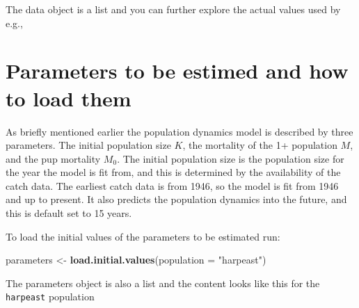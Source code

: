 \documentclass[
]{article}
\newenvironment{Shaded}{\begin{snugshade}}{\end{snugshade}}
\newcommand{\CommentTok}[1]{\textcolor[rgb]{0.56,0.35,0.01}{\textit{#1}}}
\newcommand{\DataTypeTok}[1]{\textcolor[rgb]{0.13,0.29,0.53}{#1}}
\newcommand{\KeywordTok}[1]{\textcolor[rgb]{0.13,0.29,0.53}{\textbf{#1}}}
\newcommand{\NormalTok}[1]{#1}
\newcommand{\OperatorTok}[1]{\textcolor[rgb]{0.81,0.36,0.00}{\textbf{#1}}}
\newcommand{\StringTok}[1]{\textcolor[rgb]{0.31,0.60,0.02}{#1}}
\begin{document}
The data object is a list and you can further explore the actual values
used by e.g.,

\begin{Shaded}
\end{Shaded}

\hypertarget{parameters-to-be-estimed-and-how-to-load-them}{%
\section{Parameters to be estimed and how to load
them}\label{parameters-to-be-estimed-and-how-to-load-them}}

As briefly mentioned earlier the population dynamics model is described
by three parameters. The initial population size \(K\), the mortality of
the 1+ population \(M\), and the pup mortality \(M_0\). The initial
population size is the population size for the year the model is fit
from, and this is determined by the availability of the catch data. The
earliest catch data is from 1946, so the model is fit from 1946 and up
to present. It also predicts the population dynamics into the future,
and this is default set to 15 years.

To load the initial values of the parameters to be estimated run:

\begin{Shaded}
\begin{Highlighting}[]
\NormalTok{parameters <-}\StringTok{ }\KeywordTok{load.initial.values}\NormalTok{(}\DataTypeTok{population =} \StringTok{"harpeast"}\NormalTok{)}
\end{Highlighting}
\end{Shaded}

The parameters object is also a list and the content looks like this for
the \texttt{harpeast} population
\end{document}
